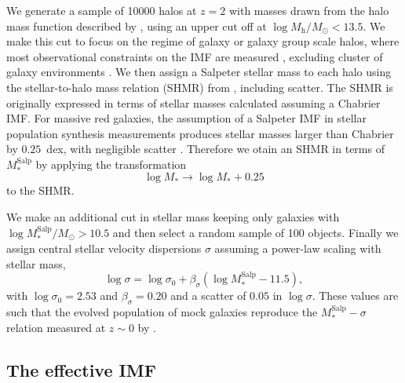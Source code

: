 \documentclass[usenatbib]{mnras}
\def\mhalo{M_{\mathrm{h}}}
\def\msalp{M_*^{\mathrm{Salp}}}
\def\Sref#1{Section~\ref{#1}\xspace}
\begin{document}
We generate a sample of 10000 halos at $z=2$ with masses drawn from the
  halo mass function described by \citet{Tin++08}, using an upper cut
  off at $\log{\mhalo/M_\odot} < 13.5$.  We make this cut to focus on
the regime of galaxy or galaxy group scale halos, where most
observational constraints on the IMF are measured \citep{Gav++07},
excluding cluster of galaxy environments \citep[though IMF constraints
  are available for some brightest cluster galaxies;][]{New++13}.  We
then assign a Salpeter stellar mass to each halo using the
stellar-to-halo mass relation (SHMR) from \citet{Lea++12}, including
scatter. 
The \citet{Lea++12} SHMR is originally expressed in terms of stellar masses calculated assuming a Chabrier IMF. %
For massive red galaxies, the assumption of a Salpeter IMF in stellar population synthesis measurements produces stellar masses larger than Chabrier by $0.25$~dex, with negligible scatter \citep{Aug++10}. 
Therefore we otain an SHMR in terms of $\msalp$ by applying the transformation
\begin{equation}
\log{M_*} \rightarrow \log{M_*} + 0.25
\end{equation}
to the \citet{Lea++12} SHMR.

We make an additional cut in stellar mass keeping only
galaxies with $\log{\msalp/M_\odot} > 10.5$ and then select a random sample of
100 objects.  Finally we assign central stellar velocity dispersions
$\sigma$ assuming a power-law scaling with stellar mass,
\begin{equation}\label{eq:mason}
\log{\sigma} = \log{\sigma_0} + \beta_\sigma(\log{\msalp} - 11.5), 
\end{equation}
with $\log{\sigma_0}=2.53$ and $\beta_\sigma=0.20$ and a scatter of
$0.05$ in $\log{\sigma}$. These values are such that the evolved
  population of mock galaxies reproduce the $\msalp-\sigma$ relation
  measured at $z\sim0$ by \citet[][see
    \Sref{ssec:drymerger}]{Aug++10}.

\subsection{The effective IMF}
\label{ssect:imfform}
\end{document}
